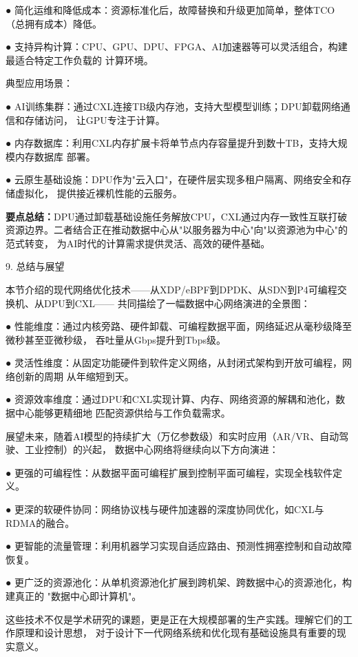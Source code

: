 ● 简化运维和降低成本：资源标准化后，故障替换和升级更加简单，整体TCO（总拥有成本）降低。
  
● 支持异构计算：CPU、GPU、DPU、FPGA、AI加速器等可以灵活组合，构建最适合特定工作负载的
  计算环境。

典型应用场景：

● AI训练集群：通过CXL连接TB级内存池，支持大型模型训练；DPU卸载网络通信和存储访问，
  让GPU专注于计算。
  
● 内存数据库：利用CXL内存扩展卡将单节点内存容量提升到数十TB，支持大规模内存数据库
  部署。
  
● 云原生基础设施：DPU作为"云入口"，在硬件层实现多租户隔离、网络安全和存储虚拟化，
  提供接近裸机性能的云服务。

\vspace{0.5em}
\noindent\textbf{要点总结：}DPU通过卸载基础设施任务解放CPU，CXL通过内存一致性互联打破
资源边界。二者结合正在推动数据中心从"以服务器为中心"向"以资源池为中心"的范式转变，
为AI时代的计算需求提供灵活、高效的硬件基础。


9.  总结与展望

本节介绍的现代网络优化技术——从XDP/eBPF到DPDK、从SDN到P4可编程交换机、从DPU到CXL——
共同描绘了一幅数据中心网络演进的全景图：

● 性能维度：通过内核旁路、硬件卸载、可编程数据平面，网络延迟从毫秒级降至微秒甚至亚微秒级，
  吞吐量从Gbps提升到Tbps级。
  
● 灵活性维度：从固定功能硬件到软件定义网络，从封闭式架构到开放可编程，网络创新的周期
  从年缩短到天。
  
● 资源效率维度：通过DPU和CXL实现计算、内存、网络资源的解耦和池化，数据中心能够更精细地
  匹配资源供给与工作负载需求。

展望未来，随着AI模型的持续扩大（万亿参数级）和实时应用（AR/VR、自动驾驶、工业控制）的兴起，
数据中心网络将继续向以下方向演进：

● 更强的可编程性：从数据平面可编程扩展到控制平面可编程，实现全栈软件定义。
  
● 更深的软硬件协同：网络协议栈与硬件加速器的深度协同优化，如CXL与RDMA的融合。
  
● 更智能的流量管理：利用机器学习实现自适应路由、预测性拥塞控制和自动故障恢复。
  
● 更广泛的资源池化：从单机资源池化扩展到跨机架、跨数据中心的资源池化，构建真正的
  "数据中心即计算机"。

这些技术不仅是学术研究的课题，更是正在大规模部署的生产实践。理解它们的工作原理和设计思想，
对于设计下一代网络系统和优化现有基础设施具有重要的现实意义。
